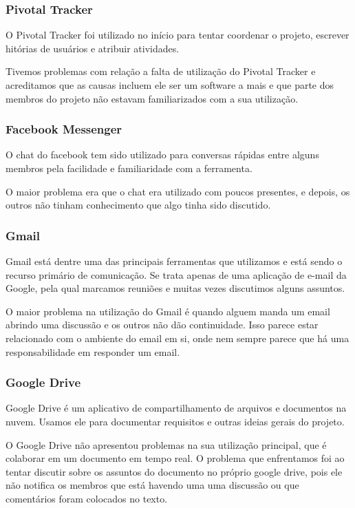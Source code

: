 \documentclass{acm_proc_article-sp}
\begin{document}
\subsubsection{Pivotal Tracker}
O Pivotal Tracker foi utilizado no início para tentar coordenar o projeto, escrever hitórias de usuários e atribuir atividades.

Tivemos problemas com relação a falta de utilização do Pivotal Tracker e acreditamos que
as causas incluem ele ser um software a mais e que parte dos membros do projeto não estavam familiarizados
com a sua utilização.

\subsubsection{Facebook Messenger}
O chat do facebook tem sido utilizado para conversas rápidas entre alguns membros pela facilidade e familiaridade com a ferramenta.

O maior problema era que o chat era utilizado com poucos presentes, e depois, os outros não tinham conhecimento
que algo tinha sido discutido.

\subsubsection{Gmail}
Gmail está dentre uma das principais ferramentas que utilizamos e está sendo o recurso primário de comunicação.
Se trata apenas de uma aplicação de e-mail da Google, pela qual marcamos reuniões e muitas vezes discutimos alguns assuntos.

O maior problema na utilização do Gmail é quando alguem manda um email abrindo uma discussão e os outros não dão continuidade.
Isso parece estar relacionado com o ambiente do email em si, onde nem sempre parece que há uma responsabilidade em responder um email.

\subsubsection{Google Drive}
Google Drive é um aplicativo de compartilhamento de arquivos e documentos na nuvem. Usamos ele para documentar requisitos e outras ideias gerais do projeto.

O Google Drive não apresentou problemas na sua utilização principal, que é colaborar em um documento em tempo real.
O problema que enfrentamos foi ao tentar discutir sobre os assuntos do documento no próprio google drive, pois ele não
notifica os membros que está havendo uma uma discussão ou que comentários foram colocados no texto.
\end{document}
